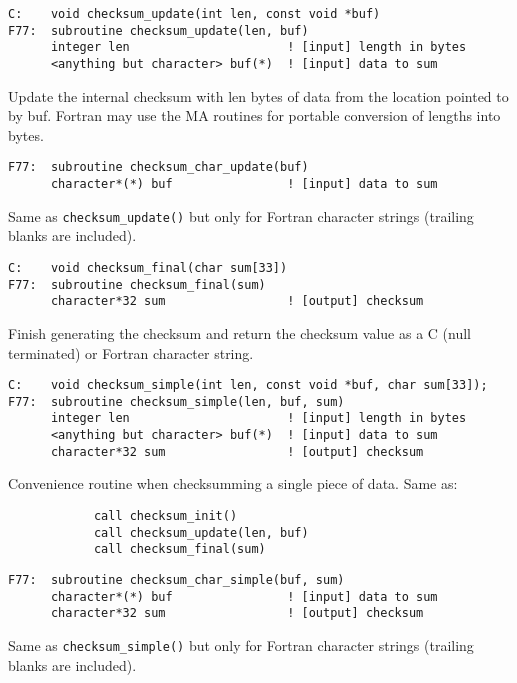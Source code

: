 \begin{verbatim}
C:    void checksum_update(int len, const void *buf)
F77:  subroutine checksum_update(len, buf)
      integer len                      ! [input] length in bytes
      <anything but character> buf(*)  ! [input] data to sum
\end{verbatim}

  Update the internal checksum with len bytes of data from the 
  location pointed to by buf.  Fortran may use the MA routines
  for portable conversion of lengths into bytes.

\begin{verbatim}
F77:  subroutine checksum_char_update(buf)
      character*(*) buf                ! [input] data to sum
\end{verbatim}

  Same as \verb+checksum_update()+ but only for Fortran character strings
  (trailing blanks are included).

\begin{verbatim}
C:    void checksum_final(char sum[33])
F77:  subroutine checksum_final(sum)
      character*32 sum                 ! [output] checksum
\end{verbatim}

  Finish generating the checksum and return the checksum value
  as a C (null terminated) or Fortran character string.

\begin{verbatim}
C:    void checksum_simple(int len, const void *buf, char sum[33]);
F77:  subroutine checksum_simple(len, buf, sum)
      integer len                      ! [input] length in bytes
      <anything but character> buf(*)  ! [input] data to sum
      character*32 sum                 ! [output] checksum
\end{verbatim}

  Convenience routine when checksumming a single piece of data.
  Same as:
\begin{verbatim}
            call checksum_init()
            call checksum_update(len, buf)
            call checksum_final(sum)
\end{verbatim}

\begin{verbatim}
F77:  subroutine checksum_char_simple(buf, sum)
      character*(*) buf                ! [input] data to sum
      character*32 sum                 ! [output] checksum
\end{verbatim}

  Same as \verb+checksum_simple()+ but only for Fortran character strings
  (trailing blanks are included).


